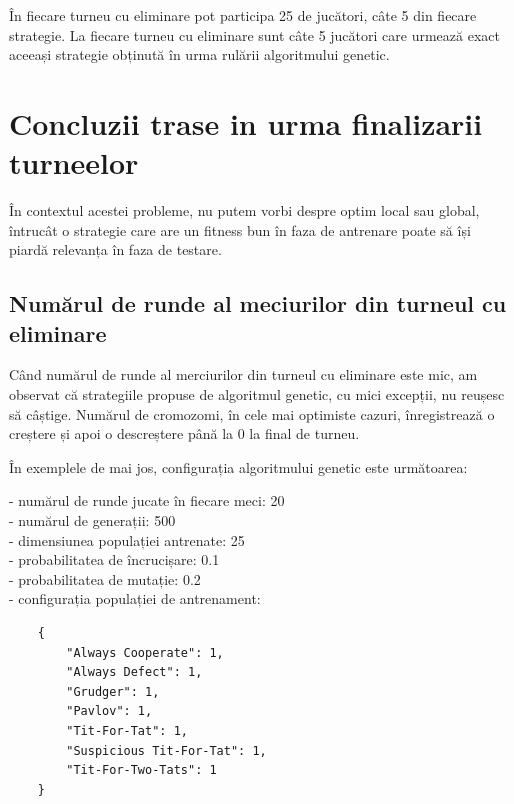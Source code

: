În fiecare turneu cu eliminare pot participa 25 de jucători, câte 5 din fiecare strategie. La fiecare turneu cu eliminare sunt câte 5 jucători care urmează exact aceeași strategie obținută în urma rulării algoritmului genetic.

\section {Concluzii trase in urma finalizarii turneelor}

În contextul acestei probleme, nu putem vorbi despre optim local sau global, întrucât o strategie care are un fitness bun în faza de antrenare poate să își piardă relevanța în faza de testare.  

\subsection{Numărul de runde al meciurilor din turneul cu eliminare}

Când numărul de runde al merciurilor din turneul cu eliminare este mic, am observat că strategiile propuse de algoritmul genetic, cu mici excepții, nu reușesc să câștige. Numărul de cromozomi, în cele mai optimiste cazuri, înregistrează o creștere și apoi o descreștere până la 0 la final de turneu. 

În exemplele de mai jos, configurația algoritmului genetic este următoarea: 

- numărul de runde jucate în fiecare meci: 20\\
- numărul de generații: 500\\
- dimensiunea populației antrenate: 25\\
- probabilitatea de încrucișare: 0.1\\
- probabilitatea de mutație: 0.2\\
- configurația populației de antrenament:\\
\begin{center}
	\begin{lstlisting}
	{
		"Always Cooperate": 1,
		"Always Defect": 1,
		"Grudger": 1,
		"Pavlov": 1,
		"Tit-For-Tat": 1,
		"Suspicious Tit-For-Tat": 1,
		"Tit-For-Two-Tats": 1
	}
\end{lstlisting}
\end{center}

